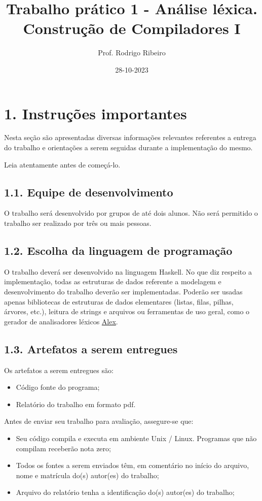 \documentclass[a4paper,11pt]{article}
\author{Prof. Rodrigo Ribeiro}
\date{28-10-2023}
\title{Trabalho prático 1 - Análise léxica.\\\medskip
\large Construção de Compiladores I}
\begin{document}
\maketitle
\section*{1. Instruções importantes}
\label{sec:orgbb564ce}

Nesta seção são apresentadas diversas informações relevantes
referentes a entrega do trabalho e orientações a serem seguidas
durante a implementação do mesmo.

Leia atentamente antes de começá-lo.
\subsection*{1.1. Equipe de desenvolvimento}
\label{sec:orga686ec3}

O trabalho será desenvolvido por grupos de até dois alunos.
Não será permitido o trabalho ser realizado por três ou
mais pessoas.
\subsection*{1.2. Escolha da linguagem de programação}
\label{sec:orgb81946b}

O trabalho deverá ser desenvolvido na linguagem Haskell.
No que diz respeito a implementação, todas as estruturas de
dados referente a modelagem e desenvolvimento do trabalho
deverão ser implementadas. Poderão ser usadas apenas
bibliotecas de estruturas de dados elementares (listas,
filas, pilhas, árvores, etc.), leitura de strings e arquivos ou
ferramentas de uso geral, como o gerador de analisadores
léxicos \href{https://haskell-alex.readthedocs.io/en/latest/}{Alex}.
\subsection*{1.3. Artefatos a serem entregues}
\label{sec:orge43983f}

Os artefatos a serem entregues são:

\begin{itemize}
\item Código fonte do programa;
\item Relatório do trabalho em formato pdf.
\end{itemize}

Antes de enviar seu trabalho para avaliação,
assegure-se que:

\begin{itemize}
\item Seu código compila e executa em ambiente Unix / Linux.
Programas que não compilam receberão nota zero;
\item Todos os fontes a serem enviados têm, em comentário no
início do arquivo, nome e matrícula do(s) autor(es) do
trabalho;
\item Arquivo do relatório tenha a identificação do(s)
autor(es) do trabalho;
\end{itemize}
\end{document}
